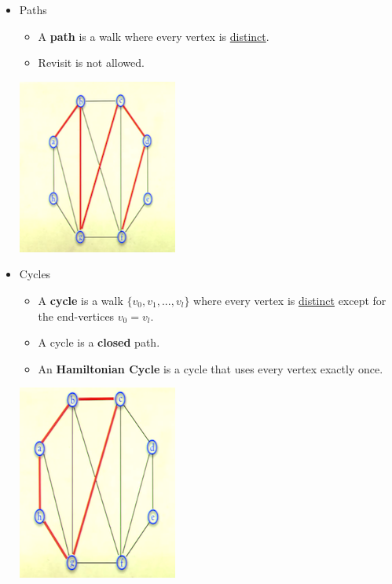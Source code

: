 \documentclass[12pt]{article}
\begin{document}
\begin{itemize}
\item Paths
	\begin{itemize}
	\item A \textbf{path} is a walk where every vertex is \underline{distinct}.
	\item Revisit is not allowed.
	\end{itemize}	
\begin{center}
\includegraphics{lecture79}
\end{center}


\item Cycles
	\begin{itemize}
	\item A \textbf{cycle} is a walk $\{v_0, v_1, ... , v_l\}$ where every vertex is \underline{distinct} except for the end-vertices $v_0 = v_l$.
	\item A cycle is a \textbf{closed} path.
	\item An \textbf{Hamiltonian Cycle} is a cycle that uses every vertex exactly once.
	\end{itemize}	
\begin{center}
\includegraphics{lecture710}
\end{center}
\end{itemize}
\end{document}
